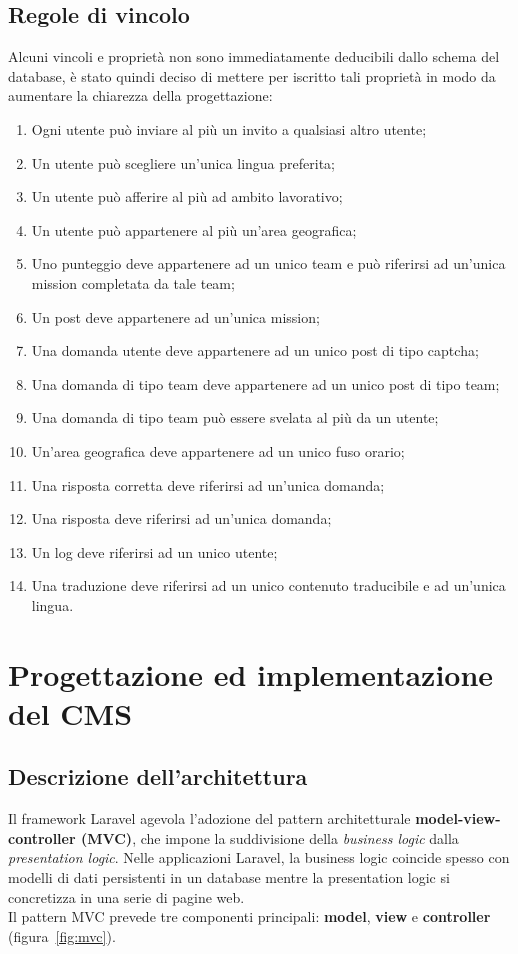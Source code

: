 \subsection{Regole di vincolo} %
Alcuni vincoli e proprietà non sono immediatamente deducibili dallo schema del database, è stato quindi deciso di mettere per iscritto tali proprietà in modo da aumentare la chiarezza della progettazione:
\begin{enumerate}
	\item Ogni utente può inviare al più un invito a qualsiasi altro utente;
	\item Un utente può scegliere un'unica lingua preferita;
	\item Un utente può afferire al più ad ambito lavorativo;
	\item Un utente può appartenere al più un'area geografica;
	\item Uno punteggio deve appartenere ad un unico team e può riferirsi ad un'unica mission completata da tale team;
	\item Un post deve appartenere ad un'unica mission;
	\item Una domanda utente deve appartenere ad un unico post di tipo captcha;
	\item Una domanda di tipo team deve appartenere ad un unico post di tipo team;
	\item Una domanda di tipo team può essere svelata al più da un utente;
	\item Un'area geografica deve appartenere ad un unico fuso orario;
	\item Una risposta corretta deve riferirsi ad un'unica domanda;
	\item Una risposta deve riferirsi ad un'unica domanda;
	\item Un log deve riferirsi ad un unico utente;
	\item Una traduzione deve riferirsi ad un unico contenuto traducibile e ad un'unica lingua.
\end{enumerate}

\section{Progettazione ed implementazione del CMS}
\subsection{Descrizione dell'architettura}
Il framework Laravel agevola l'adozione del pattern architetturale \textbf{model-view-controller (MVC)}, che impone la suddivisione della \textit{business logic} dalla \textit{presentation logic}. Nelle applicazioni Laravel, la business logic coincide spesso con modelli di dati persistenti in un database mentre la presentation logic si concretizza in una serie di pagine web. \\
Il pattern MVC prevede tre componenti principali: \textbf{model}, \textbf{view} e \textbf{controller} (figura~\ref{fig:mvc}).

